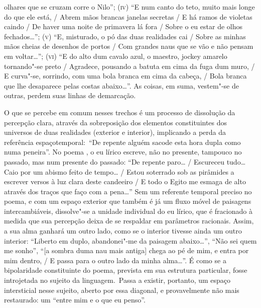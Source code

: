 olhares que se cruzam corre o Nilo''; (\textsc{iv}) ``E num canto do
teto, muito mais longe do que ele está, / Abrem mãos brancas janelas
secretas / E há ramos de violetas caindo / De haver uma noite de
primavera lá fora / Sobre o eu estar de olhos fechados\ldots{}'';
(\textsc{v}) ``E, misturado, o pó das duas realidades cai / Sobre as
minhas mãos cheias de desenhos de portos / Com grandes naus que se vão e
não pensam em voltar\ldots{}''; (\textsc{vi}) ``E do alto dum cavalo azul, o
maestro, jockey amarelo tornando"-se preto / Agradece, pousando a batuta
em cima da fuga dum muro, / E curva"-se, sorrindo, com uma bola branca em
cima da cabeça, / Bola branca que lhe desaparece pelas costas
abaixo\ldots{}''. As coisas, em suma, vestem"-se de outras, perdem suas linhas
de demarcação.

O que se percebe em comum nesses trechos é um processo de dissolução da
percepção clara, através da sobreposição dos elementos constituintes dos
universos de duas realidades (exterior e interior), implicando a perda
da referência espaçotemporal:~``De repente alguém sacode esta hora dupla
como numa peneira''. No poema , o eu lírico escreve, não no presente,
tampouco no passado, mas num presente do passado: ``De repente paro\ldots{} /
Escureceu tudo\ldots{} Caio por um abismo feito de tempo\ldots{} / Estou soterrado
sob as pirâmides a escrever versos à luz clara deste candeeiro / E todo
o Egito me esmaga de alto através dos traços que faço com a pena\ldots{}''
Sem um referente temporal preciso no poema, e com um espaço exterior que
também é já um fluxo móvel de paisagens intercambiáveis, dissolve"-se a
unidade individual do eu lírico, que é fracionado à medida que sua
percepção deixa de se respaldar em parâmetros racionais. Assim, a sua
alma ganhará um outro lado, como se o interior tivesse ainda um outro
interior: ``Liberto em duplo, abandonei"-me da paisagem abaixo\ldots{}'',
``Não sei quem me sonho'', ``{[}a sombra duma nau mais antiga{]} chega
ao pé de mim, e entra por mim dentro, / E passa para o outro lado da
minha alma\ldots{}''. É como se a bipolaridade constituinte do poema,
prevista em sua estrutura particular, fosse introjetada no sujeito da
linguagem.~Passa a existir, portanto, um espaço intersticial nesse
sujeito, aberto por essa diagonal, e provavelmente não mais restaurado:
um ``entre mim e o que eu penso''.


